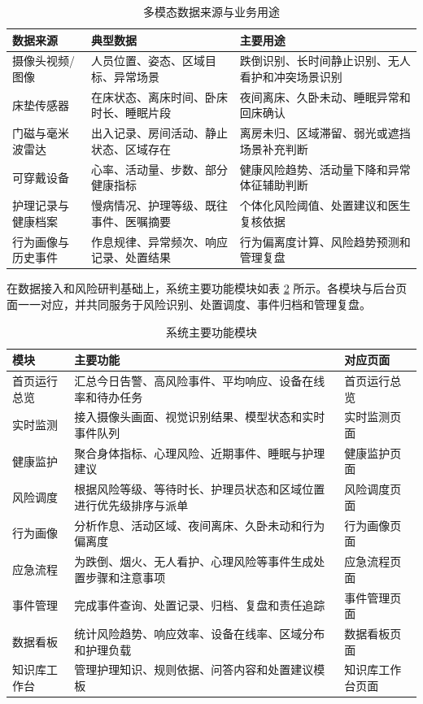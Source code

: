 \documentclass[UTF8,a4paper,zihao=-4,fontset=fandol]{ctexart}
\begin{document}
\begin{table}[H]
  \centering
  \caption{多模态数据来源与业务用途}
  \label{tab:data-sources}
  \begin{tabularx}{\textwidth}{>{\centering\arraybackslash}p{3.2cm}>{\centering\arraybackslash}p{4.2cm}>{\centering\arraybackslash}X}
    \toprule
    数据来源 & 典型数据 & 主要用途 \\
    \midrule
    摄像头视频/图像 & 人员位置、姿态、区域目标、异常场景 & 跌倒识别、长时间静止识别、无人看护和冲突场景识别 \\
    床垫传感器 & 在床状态、离床时间、卧床时长、睡眠片段 & 夜间离床、久卧未动、睡眠异常和回床确认 \\
    门磁与毫米波雷达 & 出入记录、房间活动、静止状态、区域存在 & 离房未归、区域滞留、弱光或遮挡场景补充判断 \\
    可穿戴设备 & 心率、活动量、步数、部分健康指标 & 健康风险趋势、活动量下降和异常体征辅助判断 \\
    护理记录与健康档案 & 慢病情况、护理等级、既往事件、医嘱摘要 & 个体化风险阈值、处置建议和医生复核依据 \\
    行为画像与历史事件 & 作息规律、异常频次、响应记录、处置结果 & 行为偏离度计算、风险趋势预测和管理复盘 \\
    \bottomrule
  \end{tabularx}
\end{table}

在数据接入和风险研判基础上，系统主要功能模块如表 \ref{tab:functions} 所示。各模块与后台页面一一对应，并共同服务于风险识别、处置调度、事件归档和管理复盘。

\begin{table}[H]
  \centering
  \caption{系统主要功能模块}
  \label{tab:functions}
  \begin{tabularx}{\textwidth}{>{\centering\arraybackslash}p{3cm}>{\centering\arraybackslash}X>{\centering\arraybackslash}p{3.2cm}}
    \toprule
    模块 & 主要功能 & 对应页面 \\
    \midrule
    首页运行总览 & 汇总今日告警、高风险事件、平均响应、设备在线率和待办任务 & 首页运行总览 \\
    实时监测 & 接入摄像头画面、视觉识别结果、模型状态和实时事件队列 & 实时监测页面 \\
    健康监护 & 聚合身体指标、心理风险、近期事件、睡眠与护理建议 & 健康监护页面 \\
    风险调度 & 根据风险等级、等待时长、护理员状态和区域位置进行优先级排序与派单 & 风险调度页面 \\
    行为画像 & 分析作息、活动区域、夜间离床、久卧未动和行为偏离度 & 行为画像页面 \\
    应急流程 & 为跌倒、烟火、无人看护、心理风险等事件生成处置步骤和注意事项 & 应急流程页面 \\
    事件管理 & 完成事件查询、处置记录、归档、复盘和责任追踪 & 事件管理页面 \\
    数据看板 & 统计风险趋势、响应效率、设备在线率、区域分布和护理负载 & 数据看板页面 \\
    知识库工作台 & 管理护理知识、规则依据、问答内容和处置建议模板 & 知识库工作台页面 \\
    \bottomrule
  \end{tabularx}
\end{table}
\end{document}
